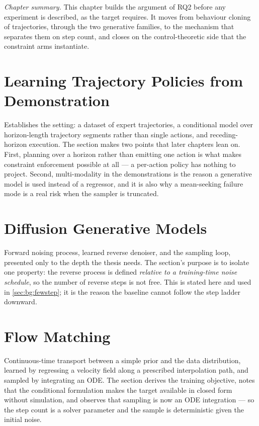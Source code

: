 \documentclass[headsepline,footsepline,footinclude=false,oneside,fontsize=11pt,paper=a4,listof=totoc,bibliography=totoc]{scrbook}
\begin{document}
\emph{Chapter summary.} This chapter builds the argument of RQ2 before any experiment is
described, as the target requires. It moves from behaviour cloning of trajectories, through
the two generative families, to the mechanism that separates them on step count, and closes
on the control-theoretic side that the constraint arms instantiate.

\section{Learning Trajectory Policies from Demonstration}\label{sec:bg:il}

Establishes the setting: a dataset of expert trajectories, a conditional model over
horizon-length trajectory segments rather than single actions, and receding-horizon
execution. The section makes two points that later chapters lean on. First, planning over a
horizon rather than emitting one action is what makes constraint enforcement possible at
all --- a per-action policy has nothing to project. Second, multi-modality in the
demonstrations is the reason a generative model is used instead of a regressor, and it is
also why a mean-seeking failure mode is a real risk when the sampler is truncated.

\section{Diffusion Generative Models}\label{sec:bg:diffusion}

Forward noising process, learned reverse denoiser, and the sampling loop, presented only to
the depth the thesis needs. The section's purpose is to isolate one property: the reverse
process is defined \emph{relative to a training-time noise schedule}, so the number of
reverse steps is not free. This is stated here and used in \ref{sec:bg:fewstep}; it is the
reason the baseline cannot follow the step ladder downward.

\section{Flow Matching}\label{sec:bg:fm}

Continuous-time transport between a simple prior and the data distribution, learned by
regressing a velocity field along a prescribed interpolation path, and sampled by
integrating an ODE. The section derives the training objective, notes that the conditional
formulation makes the target available in closed form without simulation, and observes that
sampling is now an ODE integration --- so the step count is a solver parameter and the
sample is deterministic given the initial noise.
\end{document}
